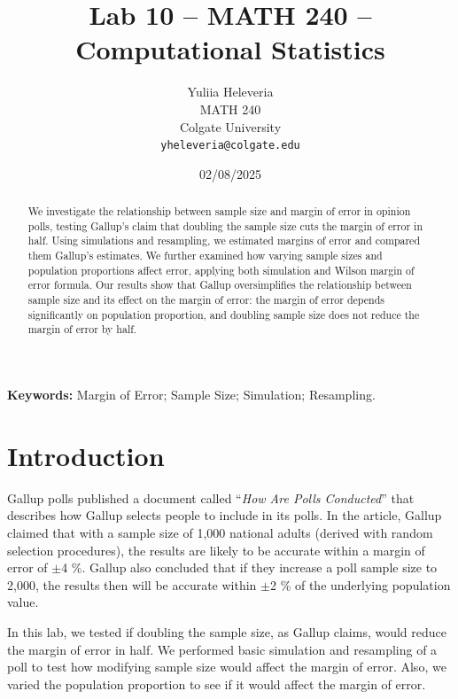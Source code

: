 \documentclass{article}\usepackage[]{graphicx}\usepackage[]{xcolor}
\begin{document}
\vspace{-1in}
\title{Lab 10 -- MATH 240 -- Computational Statistics}

\author{
  Yuliia Heleveria \\
  MATH 240  \\
  Colgate University  \\
  {\tt yheleveria@colgate.edu}
}

\date{02/08/2025}

\maketitle

\begin{multicols}{2}
\raggedcolumns %
\begin{abstract}
We investigate the relationship between sample size and margin of error in opinion polls, testing Gallup's claim that doubling the sample size cuts the margin of error in half. Using simulations and resampling, we estimated margins of error and compared them Gallup's estimates. We further examined how varying sample sizes and population proportions affect error, applying both simulation and Wilson margin of error formula. Our results show that Gallup oversimplifies the relationship between sample size and its effect on the margin of error: the margin of error depends significantly on population proportion, and doubling sample size does not reduce the margin of error by half.
\end{abstract}

\noindent \textbf{Keywords:} Margin of Error; Sample Size; Simulation; Resampling.

\section{Introduction} 

Gallup polls published a document called ``\textit{How Are Polls Conducted}'' that describes how Gallup selects people to include in its polls. In the article, Gallup claimed that with a sample size of 1,000 national adults (derived with random selection procedures), the results are likely to be accurate within a margin of error of  $\pm$4 \%. Gallup also concluded that if they increase a poll sample size to 2,000, the results then will be accurate within $\pm$2 \% of the underlying population value. 

In this lab, we tested if doubling the sample size, as Gallup claims, would reduce the margin of error in half. We performed basic simulation and resampling of a poll to test how modifying sample size would affect the margin of error. Also, we varied the population proportion to see if it would affect the margin of error.


\end{multicols}
\end{document}

